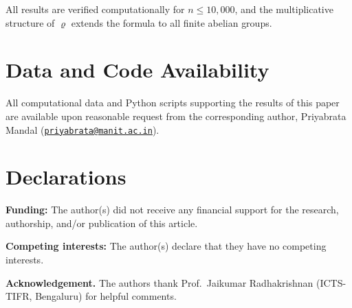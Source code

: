 \documentclass[12pt]{amsart}
\theoremstyle{bluehead}
\theoremstyle{orangehead}
\theoremstyle{greenhead}
\begin{document}
All results are verified computationally for $n\le10{,}000$, and the
multiplicative structure of $\varrho$ extends the formula to all finite
abelian groups.

\medskip
\section*{Data and Code Availability}

All computational data and Python scripts supporting the results of this
paper are available upon reasonable request from the corresponding
author, Priyabrata Mandal
(\href{mailto:priyabrata@manit.ac.in}%
{\nolinkurl{priyabrata@manit.ac.in}}).
\section*{Declarations}
\textbf{Funding:} The author(s) did not receive any financial support for the research, authorship, and/or publication of this article.
\medskip

\noindent \textbf{Competing interests:} The author(s) declare that they have no competing interests.


\medskip
\noindent\textbf{Acknowledgement.}
  The authors thank Prof.\ Jaikumar Radhakrishnan (ICTS-TIFR, Bengaluru)
  for helpful comments.
\medskip
\end{document}
